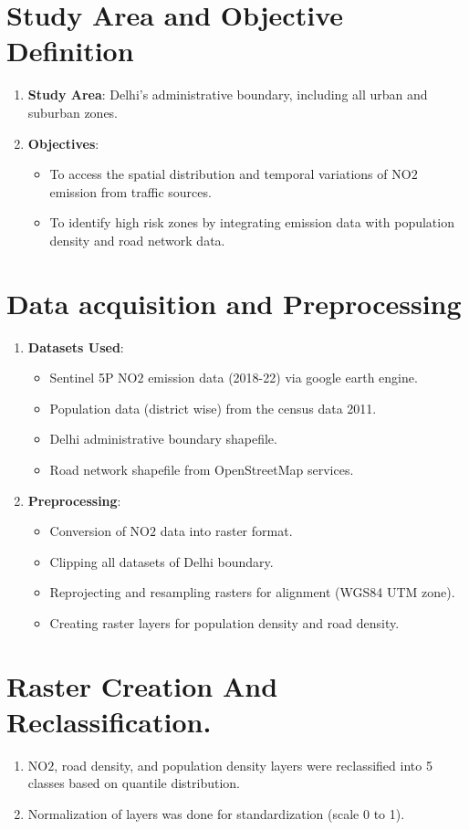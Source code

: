 \documentclass[12pt]{report}
\begin{document}
\section{Study Area and Objective Definition}
\begin{enumerate}
    \item \textbf{Study Area}: Delhi’s administrative boundary, including all urban and suburban zones.
    \item \textbf{Objectives}:
    \begin{itemize}
        \item To access the spatial distribution and temporal variations of NO$2$ emission from traffic sources.
        \item To identify high risk zones by integrating emission data with population density and road network data.
    \end{itemize}
\end{enumerate}
\section{Data acquisition and Preprocessing}
\begin{enumerate}
    \item \textbf{Datasets Used}:
    \begin{itemize}
        \item Sentinel 5P NO$2$ emission data (2018-22) via google earth engine.
        \item Population data (district wise) from the census data 2011.
        \item Delhi administrative boundary shapefile.
        \item Road network shapefile from OpenStreetMap services.
    \end{itemize}
    \item \textbf{Preprocessing}:
    \begin{itemize}
        \item Conversion of NO$2$ data into raster format.
        \item Clipping all datasets of Delhi boundary.
        \item Reprojecting and resampling rasters for alignment (WGS84 UTM zone).
        \item Creating raster layers for population density and road density.
    \end{itemize}
\end{enumerate}
\section{Raster Creation And Reclassification.}
\begin{enumerate}
    \item NO$2$, road density, and population density layers were reclassified into 5 classes based on quantile distribution.
    \item Normalization of layers was done for standardization (scale 0 to 1).
\end{enumerate}
\end{document}
